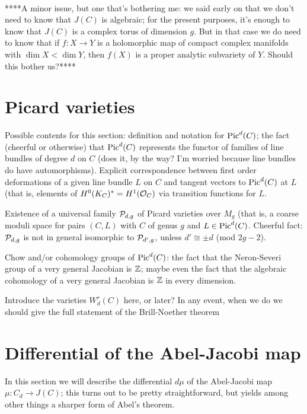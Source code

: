 \

****A minor issue, but one that's bothering me: we said early on that we don't need to know that $J(C)$ is algebraic; for the present purposes, it's enough to know that $J(C)$ is a  complex torus of dimension $g$. But in that case we do need to know that if $f : X \to Y$ is a holomorphic map of compact complex manifolds with $\dim X < \dim Y$, then $f(X)$ is a proper analytic subvariety of $Y$. Should this bother us?****


\section{Picard varieties}

Possible contents for this section: definition and notation for $\Pic^d(C)$; the fact (cheerful or otherwise) that $\Pic^d(C)$ represents the functor of families of line bundles of degree $d$ on $C$ (does it, by the way? I'm worried because line bundles do have automorphisms). Explicit correspondence between first order deformations of a given line bundle $L$ on $C$ and tangent vectors to $\Pic^d(C)$ at $L$ (that is, elements of $H^0(K_C)^* = H^1(\cO_C)$ via transition functions for $L$.

Existence of a universal family $\cP_{d,g}$ of Picard varieties over $M_g$ (that is, a coarse moduli space for pairs $(C,L)$ with $C$ of genus $g$ and $L \in \Pic^d(C)$. Cheerful fact: $\cP_{d,g}$ is not in general isomorphic to $\cP_{d',g}$, unless $d' \cong
 \pm d$ (mod $2g-2$).
 
 Chow and/or cohomology groups of $\Pic^d(C)$: the fact that the Neron-Severi group of a very general Jacobian is $\ZZ$; maybe even the fact that the algebraic cohomology of a very general Jacobian is $\ZZ$ in every dimension.
 
 Introduce the varieties $W^r_d(C)$ here, or later? In any event, when we do we should give the full statement of the Brill-Noether theorem

\section{Differential of the Abel-Jacobi map}

In this section we will describe the differential $d\mu$ of the Abel-Jacobi map $\mu : C_d \to J(C)$; this turns out to be pretty straightforward, but yields among other things a sharper form of Abel's theorem.

